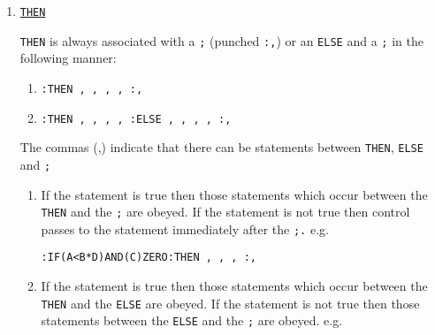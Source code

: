 \documentclass[10pt, a4paper, oneside]{article}
\newcommand{\myuline}[1]{\uline{#1}}
\newcommand{\mytt}[1]{\texttt{\scriptsize #1}}
\newcommand{\mytt}[1]{\texttt{\small #1}}
\begin{document}
\begin{multicols}{2}
\begin{enumerate}
Example:-

\begin{addmargin}[1cm]{1em}%
\begin{lstlisting}
:IF(X=3)GOTO6
:IF(Y<B:SQRT)AND(Y)NOT POSITIVE:GOTO(N1+4,ABC)
\end{lstlisting}
\end{addmargin}


\item\myuline{\mytt{THEN}}

\mytt{THEN} is always associated with a \mytt{;} (punched \mytt{:,})
or an \mytt{ELSE} and a \mytt{;} in the following manner:

\begin{enumerate}

\item
\begin{addmargin}[1cm]{1em}%
\begin{lstlisting}
:THEN , , , , :,
\end{lstlisting}
\end{addmargin}

\item
\begin{addmargin}[1cm]{1em}%
\begin{lstlisting}
:THEN , , , , :ELSE , , , , :,
\end{lstlisting}
\end{addmargin}

\end{enumerate}

The commas (,) indicate that there can be statements
between \mytt{THEN}, \mytt{ELSE} and \mytt{;}

\begin{enumerate}

\item If the statement is true then those statements
which occur between the \mytt{THEN} and the \mytt{;} are obeyed.  If
the statement is not true then control passes to the
statement immediately after the \mytt{;.} e.g.

\begin{addmargin}[0.1cm]{1em}%
\begin{lstlisting}
:IF(A<B*D)AND(C)ZERO:THEN , , , :,
\end{lstlisting}
\end{addmargin}

\item If the statement is true then those statements
which occur between the \mytt{THEN} and the \mytt{ELSE} are obeyed.
If the statement is not true then those statements
between the \mytt{ELSE} and the \mytt{;} are obeyed. e.g.


\end{enumerate}
\end{enumerate}
\end{multicols}
\end{document}
